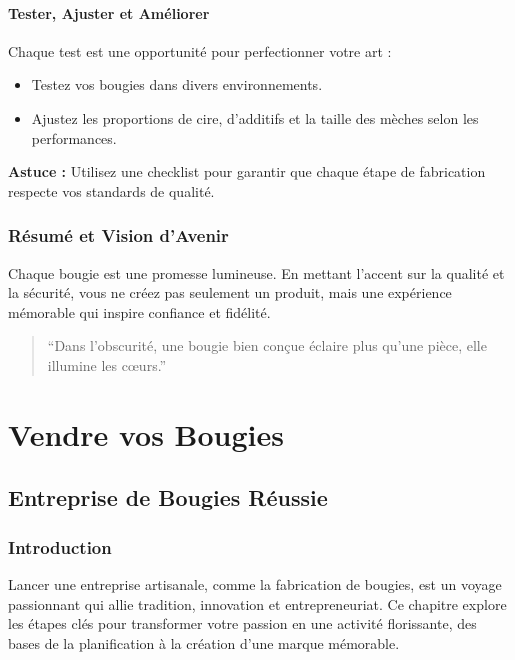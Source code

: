 \documentclass[11pt,fleqn,onecolumn,oneside]{book}
\begin{document}
\subsection*{Tester, Ajuster et Améliorer}

Chaque test est une opportunité pour perfectionner votre art :
\begin{itemize}
    \item Testez vos bougies dans divers environnements.
    \item Ajustez les proportions de cire, d’additifs et la taille des mèches selon les performances.
\end{itemize}

\begin{remark}
\textbf{Astuce :} Utilisez une checklist pour garantir que chaque étape de fabrication respecte vos standards de qualité.
\end{remark}

\section{Résumé et Vision d’Avenir}

Chaque bougie est une promesse lumineuse. En mettant l’accent sur la qualité et la sécurité, vous ne créez pas seulement un produit, mais une expérience mémorable qui inspire confiance et fidélité.

\begin{quote}
``Dans l’obscurité, une bougie bien conçue éclaire plus qu’une pièce, elle illumine les cœurs.''
\end{quote}


\part{Vendre vos Bougies}
\chapter{Entreprise de Bougies Réussie}

\section{Introduction}

\begin{definition}
Lancer une entreprise artisanale, comme la fabrication de bougies, est un voyage passionnant qui allie tradition, innovation et entrepreneuriat. Ce chapitre explore les étapes clés pour transformer votre passion en une activité florissante, des bases de la planification à la création d’une marque mémorable.
\end{definition}
\end{document}
